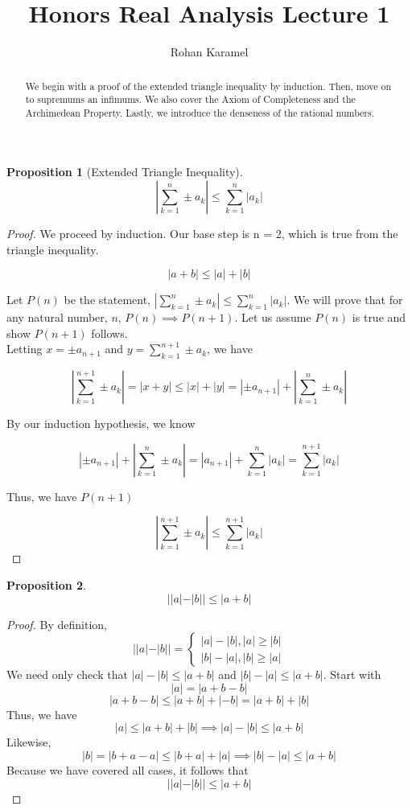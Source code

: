 \documentclass[12pt,reqno]{amsart}
\title{Honors Real Analysis Lecture 1}
\author{Rohan Karamel}
\theoremstyle{plain}
\newtheorem{proposition}{Proposition}
\begin{document}
\begin{abstract}
    We begin with a proof of the extended triangle inequality by induction. Then, move on to supremums an infimums. We also cover the Axiom of Completeness and the Archimedean Property. Lastly, we introduce the denseness of the rational numbers.
\end{abstract}

\maketitle

\begin{proposition}[Extended Triangle Inequality]
    \[ |\sum_{k=1}^n\pm a_k| \le \sum_{k=1}^n |a_k| \]
\end{proposition}


\begin{proof}
    We proceed by induction.
    Our base step is n = 2, which is true from the triangle inequality.

    \[ |a + b| \le |a| + |b| \]

    Let $P(n)$ be the statement, $|\sum_{k=1}^n\pm a_k| \le \sum_{k=1}^n |a_k|$. 
    We will prove that for any natural number, $n$, $P(n) \implies P(n+1)$. 
    Let us assume $P(n)$ is true and show $P(n+1)$ follows. \\
    Letting $x = \pm a_{n+1}$ and $y = \sum_{k=1}^{n+1}\pm a_k$, we have

    \[ |\sum_{k=1}^{n+1}\pm a_k| = |x + y| \le |x| + |y| = |\pm a_{n+1}| + |\sum_{k=1}^{n}\pm a_k| \]

    By our induction hypothesis, we know

    \[ |\pm a_{n+1}| + |\sum_{k=1}^{n}\pm a_k| = |a_{n+1}| + \sum_{k=1}^n|a_k| = \sum_{k=1}^{n+1}|a_k| \]

    Thus, we have $P(n+1)$

    \[ |\sum_{k=1}^{n+1}\pm a_k| \le \sum_{k=1}^{n+1}|a_k|\]

\end{proof}

\pagebreak

\begin{proposition}
    \[ ||a| - |b|| \le |a+b| \]
\end{proposition}

\begin{proof}
    By definition, 
    \[ ||a| - |b|| = 
    \begin{cases}
        |a| - |b|, |a| \ge |b| \\
        |b| - |a|, |b| \ge |a|
    \end{cases}\]
    We need only check that $|a| - |b| \le |a+b|$ and $|b| - |a| \le |a+b|$.
    Start with
    \[ |a| = |a + b - b| \]
    \[ |a + b - b| \le |a + b| + |-b| = |a + b| + |b| \]
    Thus, we have
    \[ |a| \le |a + b| + |b| \implies |a| - |b| \le |a + b| \]
    Likewise,
    \[ |b| = |b+a-a| \le |b+a| + |a| \implies |b|-|a| \le |a+b|\]
    Because we have covered all cases, it follows that
    \[ ||a| - |b|| \le |a+b| \]
\end{proof}
\end{document}
